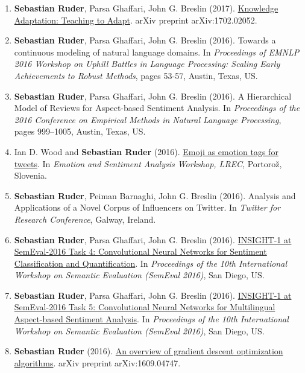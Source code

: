 \documentclass[10pt,letterpaper]{article}
\begin{document}
\begin{enumerate}
	\item \textbf{Sebastian Ruder}, Parsa Ghaffari, John G. Breslin (2017). \href{https://arxiv.org/abs/1702.02052}{Knowledge Adaptation: Teaching to Adapt}. arXiv preprint arXiv:1702.02052.
	
	\item \textbf{Sebastian Ruder}, Parsa Ghaffari, John G. Breslin (2016). Towards a continuous modeling of natural language domains. In \textit{Proceedings of EMNLP 2016 Workshop on Uphill Battles in Language Processing: Scaling Early Achievements to Robust Methods}, pages 53-57, Austin, Texas, US.
	
	\item \textbf{Sebastian Ruder}, Parsa Ghaffari, John G. Breslin (2016). A Hierarchical Model of Reviews for Aspect-based Sentiment Analysis. In \textit{Proceedings of the 2016 Conference on Empirical Methods in Natural Language Processing}, pages 999–1005, Austin, Texas, US.
	
	\item Ian D. Wood and \textbf{Sebastian Ruder} (2016). \href{http://gsi.dit.upm.es/esa2016/Proceedings-ESA2016.pdf}{Emoji as emotion tags for tweets}. In \textit{Emotion and Sentiment Analysis Workshop, LREC}, Portorož, Slovenia.
	
	\item \textbf{Sebastian Ruder}, Peiman Barnaghi, John G. Breslin (2016). Analysis and Applications of a Novel Corpus of Influencers on Twitter. In \textit{Twitter for Research Conference}, Galway, Ireland.
	
	\item \textbf{Sebastian Ruder}, Parsa Ghaffari, John G. Breslin (2016). \href{http://www.anthology.aclweb.org/S/S16/S16-1026.pdf}{INSIGHT-1 at SemEval-2016 Task 4: Convolutional Neural Networks for Sentiment Classification and Quantification}. In \textit{Proceedings of the 10th International Workshop on Semantic Evaluation (SemEval 2016)}, San Diego, US.
	
	\item \textbf{Sebastian Ruder}, Parsa Ghaffari, John G. Breslin (2016). \href{http://www.aclweb.org/anthology/S/S16/S16-1053.pdf}{INSIGHT-1 at SemEval-2016 Task 5: Convolutional Neural Networks for Multilingual Aspect-based Sentiment Analysis}. In \textit{Proceedings of the 10th International Workshop on Semantic Evaluation (SemEval 2016)}, San Diego, US.
	
	\item \textbf{Sebastian Ruder} (2016). \href{https://arxiv.org/pdf/1609.04747.pdf}{An overview of gradient descent optimization algorithms}. arXiv preprint arXiv:1609.04747.

\end{enumerate}
\end{document}
